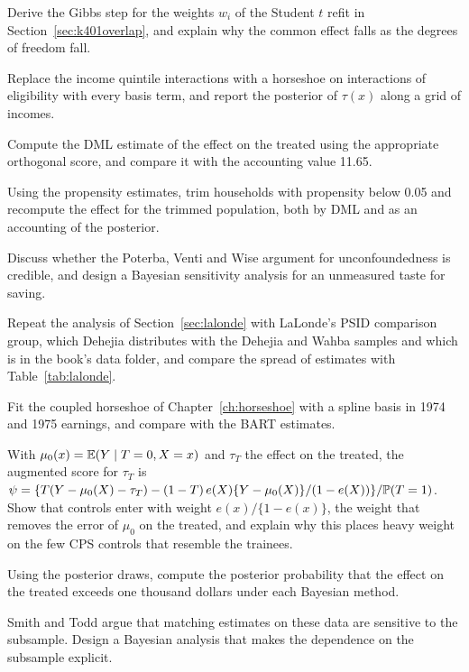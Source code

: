 \begin{exercises}
\item\label{ex:chk401:1} Derive the Gibbs step for the weights $w_i$ of the Student $t$ refit in Section~\ref{sec:k401overlap}, and explain why the common effect falls as the degrees of freedom fall.
\item\label{ex:chk401:2} Replace the income quintile interactions with a horseshoe on interactions of eligibility with every basis term, and report the posterior of $\tau(x)$ along a grid of incomes.
\item\label{ex:chk401:3} Compute the DML estimate of the effect on the treated using the appropriate orthogonal score, and compare it with the accounting value 11.65.
\item\label{ex:chk401:4} Using the propensity estimates, trim households with propensity below 0.05 and recompute the effect for the trimmed population, both by DML and as an accounting of the posterior.
\item\label{ex:chk401:5} Discuss whether the Poterba, Venti and Wise argument for unconfoundedness is credible, and design a Bayesian sensitivity analysis for an unmeasured taste for saving.

\item\label{ex:chlalonde:1} Repeat the analysis of Section~\ref{sec:lalonde} with LaLonde's PSID comparison group, which Dehejia distributes with the Dehejia and Wahba samples and which is in the book's data folder, and compare the spread of estimates with Table~\ref{tab:lalonde}.
\item\label{ex:chlalonde:2} Fit the coupled horseshoe of Chapter~\ref{ch:horseshoe} with a spline basis in 1974 and 1975 earnings, and compare with the BART estimates.
\item\label{ex:chlalonde:3} With $\mu_0(x) = \mathbb{E}(Y \mid T = 0, X = x)$ and $\tau_T$ the effect on the treated, the augmented score for $\tau_T$ is $\psi = \{T(Y - \mu_0(X) - \tau_T) - (1 - T)\,e(X)\{Y - \mu_0(X)\}/(1 - e(X))\}/\mathbb{P}(T = 1)$. Show that controls enter with weight $e(x)/\{1 - e(x)\}$, the weight that removes the error of $\mu_0$ on the treated, and explain why this places heavy weight on the few CPS controls that resemble the trainees.
\item\label{ex:chlalonde:4} Using the posterior draws, compute the posterior probability that the effect on the treated exceeds one thousand dollars under each Bayesian method.
\item\label{ex:chlalonde:5} Smith and Todd argue that matching estimates on these data are sensitive to the subsample. Design a Bayesian analysis that makes the dependence on the subsample explicit.
\end{exercises}
